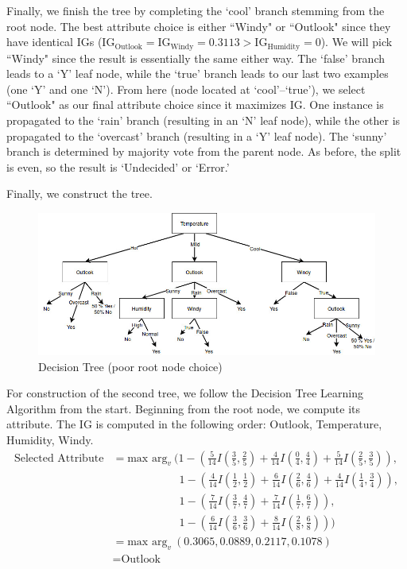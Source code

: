 \documentclass[12pt]{article}
\begin{document}
	Finally, we finish the tree by completing the `cool' branch stemming from the root node. The best attribute choice is either ``Windy" or ``Outlook" since they have identical IGs ($\text{IG}_{\text{Outlook}} = \text{IG}_{\text{Windy}} = 0.3113 > \text{IG}_{\text{Humidity}} = 0$). We will pick ``Windy" since the result is essentially the same either way. The `false' branch leads to a `Y' leaf node, while the `true' branch leads to our last two examples (one `Y' and one `N'). From here (node located at `cool'--`true'), we select ``Outlook" as our final attribute choice since it maximizes IG. One instance is propagated to the `rain' branch (resulting in an `N' leaf node), while the other is propagated to the `overcast' branch (resulting in a `Y' leaf node). The `sunny' branch is determined by majority vote from the parent node. As before, the split is even, so the result is `Undecided' or `Error.' \par
	Finally, we construct the tree.
	\begin{figure}[H]
		\begin{center}
			\includegraphics[width=440pt]{hw3_ml_tree1.jpg}
			\caption{Decision Tree (poor root node choice)}
			\label{fig:tree1}
		\end{center}
	\end{figure}
	For construction of the second tree, we follow the Decision Tree Learning Algorithm from the start. Beginning from the root node, we compute its attribute. The IG is computed in the following order: Outlook, Temperature, Humidity, Windy.
	\begin{align*}
	\text{Selected Attribute} &= \text{max arg}_{v} \  (1-(\frac{5}{14}I(\frac{3}{5},\frac{2}{5}) + \frac{4}{14}I(\frac{0}{4},\frac{4}{4}) + \frac{5}{14}I(\frac{2}{5},\frac{3}{5})), \\
	&\qquad\qquad\qquad 1-(\frac{4}{14}I(\frac{1}{2},\frac{1}{2}) + \frac{6}{14}I(\frac{2}{6},\frac{4}{6}) + \frac{4}{14}I(\frac{1}{4},\frac{3}{4})), \\
	&\qquad\qquad\qquad 1-(\frac{7}{14}I(\frac{3}{7},\frac{4}{7}) + \frac{7}{14}I(\frac{1}{7},\frac{6}{7})), \\
	&\qquad\qquad\qquad 1-(\frac{6}{14}I(\frac{3}{6},\frac{3}{6}) + \frac{8}{14}I(\frac{2}{8},\frac{6}{8}))) \\
	&= \text{max arg}_{v} \ (0.3065, 0.0889, 0.2117, 0.1078) \\
	&= \text{Outlook}
	\end{align*}
\end{document}
